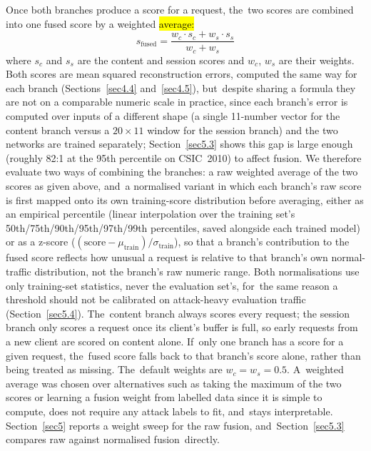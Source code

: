 \documentclass[futureinternet,article,accept,moreauthors]{Definitions/mdpi}
\begin{document}
Once both branches produce a score for a request, the~two scores are combined into one fused score by a weighted \hl{average:} %
\begin{equation}
s_{\text{fused}} = \frac{w_c \cdot s_c + w_s \cdot s_s}{w_c + w_s}
\end{equation}
where $s_c$ and $s_s$ are the content and session scores and $w_c$, $w_s$ are their weights. Both scores are mean squared reconstruction errors, computed the same way for each branch (Sections~\ref{sec4.4} and~\ref{sec4.5}), but~despite sharing a formula they are not on a comparable numeric scale in practice, since each branch's error is computed over inputs of a different shape (a single 11-number vector for the content branch versus a $20\times11$ window for the session branch) and the two networks are trained separately; Section~\ref{sec5.3} shows this gap is large enough (roughly 82:1 at the 95th percentile on CSIC~2010) to affect fusion. We therefore evaluate two ways of combining the branches: a raw weighted average of the two scores as given above, and~a normalised variant in which each branch's raw score is first mapped onto its own training-score distribution before averaging, either as an empirical percentile (linear interpolation over the training set's 50th/75th/90th/95th/97th/99th percentiles, saved alongside each trained model) or as a z-score ($(\text{score}-\mu_{\text{train}})/\sigma_{\text{train}}$), so that a branch's contribution to the fused score reflects how unusual a request is relative to that branch's own normal-traffic distribution, not the branch's raw numeric range. Both normalisations use only training-set statistics, never the evaluation set's, for~the same reason a threshold should not be calibrated on attack-heavy evaluation traffic (Section~\ref{sec5.4}). The~content branch always scores every request; the session branch only scores a request once its client's buffer is full, so early requests from a new client are scored on content alone. If~only one branch has a score for a given request, the~fused score falls back to that branch's score alone, rather than being treated as missing. The~default weights are $w_c = w_s = 0.5$. A~weighted average was chosen over alternatives such as taking the maximum of the two scores or learning a fusion weight from labelled data since it is simple to compute, does not require any attack labels to fit, and~stays interpretable. Section~\ref{sec5} reports a weight sweep for the raw fusion, and~Section~\ref{sec5.3} compares raw against normalised fusion~directly.
\end{document}

